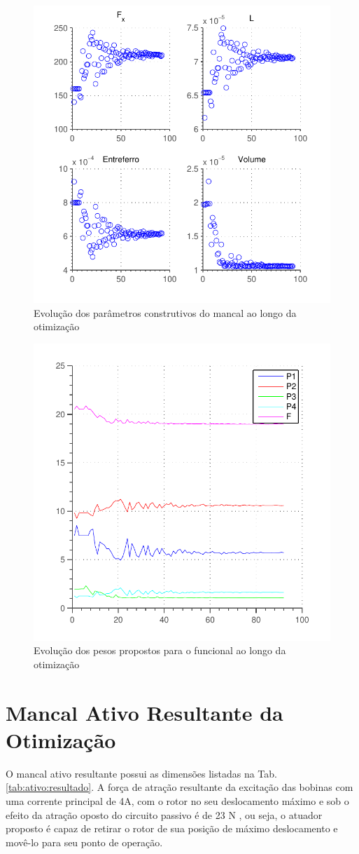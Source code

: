 \begin{figure}[ht!]
	\centering
	\includegraphics[width=0.6\linewidth]{Figs/Simulacoes/Ativo/otimizacao_ativo_parametros}
	\caption{Evolução dos parâmetros construtivos do mancal ao longo da otimização}
	\label{fig:otimizacao_ativo_parametros}
\end{figure}

\begin{figure}[ht!]
\centering
\includegraphics[width=0.6\linewidth]{Figs/Simulacoes/Ativo/otimizacao_ativo_pesos}
\caption{Evolução dos pesos propostos para o funcional ao longo da otimização}
\label{fig:otimizacao_ativo_pesos}
\end{figure}


\section{Mancal Ativo Resultante da Otimização}

O mancal ativo resultante possui as dimensões listadas na Tab. \ref{tab:ativo:resultado}. A força de atração resultante da excitação das bobinas com uma corrente principal de 4A, com o rotor no seu deslocamento máximo e sob o efeito da atração oposto do circuito passivo é de 23 N , ou seja, o atuador proposto é capaz de retirar o rotor de sua posição de máximo deslocamento e movê-lo para seu ponto de operação.

